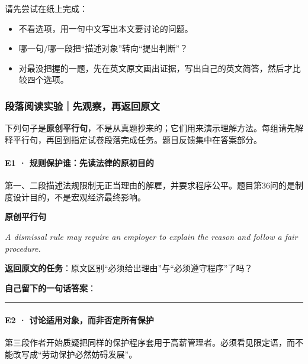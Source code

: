 \documentclass[
  11pt,
]{ctexart}
\providecommand{\tightlist}{%
  \setlength{\itemsep}{0pt}\setlength{\parskip}{0pt}}
\renewenvironment{quote}{\begin{tcolorbox}[enhanced,breakable,colback=sand,colframe=primary!22,boxrule=0.4pt,arc=2pt,left=2.6mm,right=2.6mm,top=1.6mm,bottom=1.6mm]\itshape}{\end{tcolorbox}}
\begin{document}
请先尝试在纸上完成：

\begin{itemize}
\tightlist
\item
  不看选项，用一句中文写出本文要讨论的问题。
\item
  哪一句/哪一段把``描述对象''转向``提出判断''？
\item
  对最没把握的一题，先在英文原文画出证据，写出自己的英文简答，然后才比较四个选项。
\end{itemize}

\subsubsection{段落阅读实验｜先观察，再返回原文}\label{ux6bb5ux843dux9605ux8bfbux5b9eux9a8cux5148ux89c2ux5bdfux518dux8fd4ux56deux539fux6587-1}

下列句子是\textbf{原创平行句}，不是从真题抄来的；它们用来演示理解方法。每组请先解释平行句，再回到指定试卷段落完成任务。题目反馈集中在答案部分。

\paragraph{E1 ·
规则保护谁：先读法律的原初目的}\label{e1-ux89c4ux5219ux4fddux62a4ux8c01ux5148ux8bfbux6cd5ux5f8bux7684ux539fux521dux76eeux7684}

第一、二段描述法规限制无正当理由的解雇，并要求程序公平。题目第36问的是制度设计目的，不是宏观经济最终影响。

\textbf{原创平行句}

\begin{quote}
A dismissal rule may require an employer to explain the reason and
follow a fair procedure.
\end{quote}

\textbf{返回原文的任务}：原文区别``必须给出理由''与``必须遵守程序''了吗？

\textbf{自己留下的一句话答案}：

\rule{0.75\linewidth}{0.35pt}

\paragraph{E2 ·
讨论适用对象，而非否定所有保护}\label{e2-ux8ba8ux8bbaux9002ux7528ux5bf9ux8c61ux800cux975eux5426ux5b9aux6240ux6709ux4fddux62a4}

第三段作者开始质疑把同样的保护程序套用于高薪管理者。必须看见限定语，而不能改写成``劳动保护必然妨碍发展''。
\end{document}
